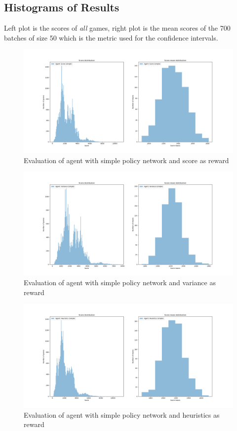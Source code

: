 \documentclass[11pt, fleqn]{article}
\begin{document}
\subsection{Histograms of Results}\label{hist}
Left plot is the scores of \textit{all} games, right plot is the mean scores of the 700 batches of size 50 which is the metric used for the confidence intervals.
\begin{figure}[H]
	\centering
	\includegraphics[width=\linewidth]{"eval_score_simple"}
	\caption{Evaluation of agent with simple policy network and score as reward}
\end{figure}
\begin{figure}[H]
	\centering
	\includegraphics[width=\linewidth]{"eval_variance_simple"}
	\caption{Evaluation of agent with simple policy network and variance as reward}
\end{figure}

\begin{figure}[H]
	\centering
	\includegraphics[width=\linewidth]{"eval_heuristics_simple"}
	\caption{Evaluation of agent with simple policy network and heuristics as reward}
\end{figure}
\end{document}
